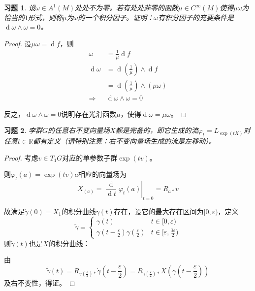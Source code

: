 \documentclass[winfonts,UTF8,c5size,a4paper,fancyhdr,hyperref,titlepage,nocap]{ctexart}
\newtheorem{xiti}{习题}
\theoremstyle{definition}
\theoremstyle{remark}
\numberwithin{equation}{subsection}
\newcommand{\Real}{\mathbb{R}}
\newcommand{\red}{\color{red}}
\newcommand{\dd}{\operatorname{d}}
\newcommand{\dt}{\frac{\operatorname{d}}{\operatorname{d}t}}
\newcommand{\local}[2]{\left.{#1}\right|_{#2}}%
\newcommand{\localt}[1]{\local{#1}{t=0}}%
\begin{document}
\begin{xiti}
  设$\omega\in A^1(M)$处处不为零。若有处处非零的函数$\mu\in C^{\infty}(M)$使得$\mu\omega$为恰当的$1$形式，则称$\mu$为$\omega$的一个{\red 积分因子}。证明：$\omega$有积分因子的充要条件是$\dd\omega\wedge\omega=0$。
\end{xiti}
\begin{proof}
  设$\mu\omega=\dd f$，则
  \begin{align*}
    \omega &=\frac{1}{\mu}\dd f \\
    \dd\omega &=\dd(\frac{1}{\mu})\wedge\dd f\\
                      &=\dd(\frac{1}{\mu})\wedge(\mu\omega)\\
    \Longrightarrow&\dd\omega\wedge\omega=0
  \end{align*}

  反之，$\dd\omega\wedge\omega=0$说明存在光滑函数$\mu$，使得$\dd\omega=\mu\omega$。
\end{proof}

\begin{xiti}
  李群$G$的任意右不变向量场$X$都是{\red 完备}的，即它生成的流$\varphi_t=L_{\exp(tX)}$对任意$t\in\Real$都有定义（请特别注意：右不变向量场生成的流是左移动）。
\end{xiti}
\begin{proof}
  考虑$v\in T_1G$对应的单参数子群$\exp(tv)$。

  则$\varphi_t(a)=\exp(tv)a$相应的向量场为
  \begin{equation*}
    X_{(a)}=\localt{\dt\varphi_t(a)}=R_{a\ast}v
  \end{equation*}

  故满足$\dot{\gamma}(0)=X_1$的积分曲线$\gamma(t)$存在，设它的最大存在区间为$[0,\varepsilon)$，定义
   \begin{equation*}
     \widetilde{\gamma}=
     \begin{cases}
       \gamma(t) & t\in[0,\varepsilon)\\
       \gamma(t-\frac{\varepsilon}{2})\gamma(\frac{\varepsilon}{2}) & t\in[\varepsilon,\frac{3\varepsilon}{2})
     \end{cases}
   \end{equation*}
   则$\widetilde{\gamma}(t)$也是$X$的积分曲线：

   由
   \begin{equation*}
     \dot{\widetilde{\gamma}}(t)=R_{\gamma(\frac{\varepsilon}{2})\ast}\dot{\gamma}(t-\frac{\varepsilon}{2})=R_{\gamma(\frac{\varepsilon}{2})\ast}X(\gamma(t-\frac{\varepsilon}{2}))
   \end{equation*}
   及右不变性，得证。
\end{proof}
\end{document}
